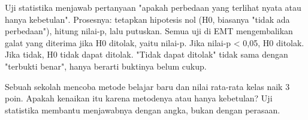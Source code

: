 \documentclass[a4paper,10pt]{article}
\begin{document}
\begin{eulernotebook}
\begin{eulercomment}
\begin{eulercomment}
\begin{eulercomment}
\begin{eulercomment}
\begin{eulercomment}
\begin{eulercomment}
\begin{eulercomment}
\begin{eulercomment}
\begin{eulercomment}
\begin{eulercomment}
\begin{eulercomment}
\begin{eulercomment}
\begin{eulercomment}
\begin{eulercomment}
\begin{eulercomment}
\begin{eulercomment}
\begin{eulercomment}
\begin{eulercomment}
\begin{eulercomment}
\begin{eulercomment}
\begin{eulercomment}
\begin{eulercomment}
\begin{eulercomment}
\end{eulercomment}
\begin{eulercomment}
Uji statistika menjawab pertanyaan "apakah perbedaan yang terlihat nyata atau hanya
kebetulan". Prosesnya: tetapkan hipotesis nol (H0, biasanya "tidak ada perbedaan"), hitung
nilai-p, lalu putuskan. Semua uji di EMT mengembalikan galat yang diterima jika H0 ditolak,
yaitu nilai-p. Jika nilai-p \textless{} 0,05, H0 ditolak. Jika tidak, H0 tidak dapat ditolak.
"Tidak dapat ditolak" tidak sama dengan "terbukti benar", hanya berarti buktinya belum
cukup.

\end{eulercomment}
\begin{eulercomment}
Sebuah sekolah mencoba metode belajar baru dan nilai rata-rata kelas naik 3 poin. Apakah
kenaikan itu karena metodenya atau hanya kebetulan? Uji statistika membantu menjawabnya
dengan angka, bukan dengan perasaan.


\end{eulercomment}
\end{eulercomment}
\end{eulercomment}
\end{eulercomment}
\end{eulercomment}
\end{eulercomment}
\end{eulercomment}
\end{eulercomment}
\end{eulercomment}
\end{eulercomment}
\end{eulercomment}
\end{eulercomment}
\end{eulercomment}
\end{eulercomment}
\end{eulercomment}
\end{eulercomment}
\end{eulercomment}
\end{eulercomment}
\end{eulercomment}
\end{eulercomment}
\end{eulercomment}
\end{eulercomment}
\end{eulercomment}
\end{eulernotebook}
\end{document}
